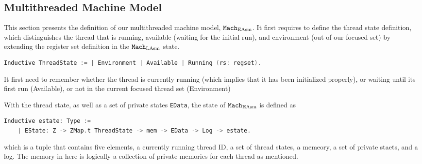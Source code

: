 \subsection{Multithreaded Machine Model}
\label{chapter:linking:subsec:multithreaded-machine-model}

This section presents the definition of our multithreaded machine model,
${\mathrm{\texttt{Mach}}}_{\mathrm{EAsm}}$.
It first requires to define the thread state definition, which distinguishes
the thread that is running, available (waiting  for the initial run), 
and environment (out of our focused set) by extending the register set definition in the ${\mathrm{\texttt{Mach}}}_{\mathrm{LAsm}}$ state.
\begin{lstlisting}[language=C]
Inductive ThreadState := | Environment | Available | Running (rs: regset).
\end{lstlisting}
It first need to remember whether the thread is currently running (which implies that it has been initialized properly),
or waiting until its first run (Available), or not in the current focused thread set (Environment)

With the thread state, as well as a set of private states  \lstinline$EData$, the state of ${\mathrm{\texttt{Mach}}}_{\mathrm{EAsm}}$ is defined as
\begin{lstlisting}[language=C]
  Inductive estate: Type :=
    | EState: Z -> ZMap.t ThreadState -> mem -> EData -> Log -> estate.
\end{lstlisting}
which is a tuple that contains five elements,
a currently running thread ID, a set of thread states, a memeory, a set of private staets, and a log. 
The memory in here is logically a collection of private memories for each thread as mentioned. 
%


